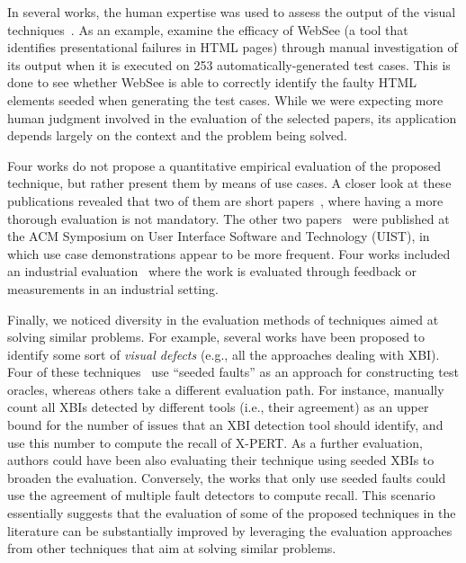 In several works, the human expertise was used to 
assess the output of the visual 
techniques~\cite{Mahajan-2015-ICST, Hori-2015-SEKE, 
Mahajan-2016-ICST, Kuchta-2018-EMSE, Xu-2018-TOIT, 
Ponzanelli-2016-ICSE, Choudhary-2010-ICSM, 
Choudhary-2012-ICST, Choudhary-2013-ICSE}.
As an example, \citet{Mahajan-2015-ICST} examine 
the efficacy of WebSee (a tool that identifies 
presentational failures in HTML pages)
through manual investigation of its output
when it is executed on 253 automatically-generated 
test cases.
This is done to see whether WebSee is able to 
correctly identify the faulty HTML elements
seeded when generating the test cases.
While we were expecting more human judgment 
involved in the evaluation of the selected papers, 
its application depends largely on the context 
and the problem being solved. 

Four works do not propose a quantitative empirical 
evaluation of the proposed technique, but 
rather present them by means of use cases.
A closer look at these publications revealed 
that two of them are short papers~\cite{Alegroth-2013-ICST, Scharf-2013-ICSE},
where having a more thorough evaluation is not 
mandatory. 
The other two papers~\cite{Burg-2015-UIST, 
Deka-2016-UIST} were published at the ACM Symposium 
on User Interface Software and Technology (UIST), 
in which use case demonstrations appear to be more frequent.
Four works included an industrial 
evaluation~\cite{Li-2010-CHI, Mahajan-2015-ICST, 
Amalfitano-2014-WISE, Kuchta-2018-EMSE} where the work is evaluated 
through feedback or measurements in an industrial setting.




Finally, 
we noticed diversity in the evaluation methods of techniques aimed at solving similar problems. 
For example, several works have been proposed to identify some sort of \textit{visual defects} (e.g., all the approaches dealing with XBI). 
Four of these techniques~\cite{Mahajan-2014-ASE, Mahajan-2015-ICST, Mahajan-2016-ICST, Patric-2016-ASE} use ``seeded faults'' as an approach for constructing test oracles, whereas others take a different evaluation path. 
For instance, \citet{Choudhary-2013-ICSE} manually count all XBIs detected by different tools (i.e., their agreement)
as an upper bound for the number of issues that an XBI detection tool should identify, and use this number to compute the recall of X-PERT. As a further evaluation, authors could have been also evaluating their technique using seeded XBIs
to broaden the evaluation. 
Conversely, the works that only use seeded faults could use the agreement of multiple fault detectors to compute recall. 
This scenario essentially suggests that the evaluation of some of the proposed techniques in the literature can be substantially improved by leveraging the evaluation approaches from other techniques that aim at solving similar problems. 

